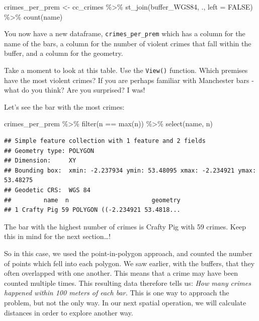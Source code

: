 \documentclass[
]{book}
\newenvironment{Shaded}{\begin{snugshade}}{\end{snugshade}}
\newcommand{\AttributeTok}[1]{\textcolor[rgb]{0.77,0.63,0.00}{#1}}
\newcommand{\ConstantTok}[1]{\textcolor[rgb]{0.00,0.00,0.00}{#1}}
\newcommand{\FunctionTok}[1]{\textcolor[rgb]{0.00,0.00,0.00}{#1}}
\newcommand{\NormalTok}[1]{#1}
\newcommand{\OtherTok}[1]{\textcolor[rgb]{0.56,0.35,0.01}{#1}}
\newcommand{\SpecialCharTok}[1]{\textcolor[rgb]{0.00,0.00,0.00}{#1}}
\begin{document}
\begin{Shaded}
\begin{Highlighting}[]
\NormalTok{crimes\_per\_prem }\OtherTok{\textless{}{-}}\NormalTok{ cc\_crimes }\SpecialCharTok{\%\textgreater{}\%} 
  \FunctionTok{st\_join}\NormalTok{(buffer\_WGS84, ., }\AttributeTok{left =} \ConstantTok{FALSE}\NormalTok{) }\SpecialCharTok{\%\textgreater{}\%} 
  \FunctionTok{count}\NormalTok{(name)}
\end{Highlighting}
\end{Shaded}

You now have a new dataframe, \texttt{crimes\_per\_prem} which has a column for the name of the bars, a column for the number of violent crimes that fall within the buffer, and a column for the geometry.

Take a moment to look at this table. Use the \texttt{View()} function. Which premises have the most violent crimes? If you are perhaps familiar with Manchester bars - what do you think? Are you surprised? I was!

Let's see the bar with the most crimes:

\begin{Shaded}
\begin{Highlighting}[]
\NormalTok{crimes\_per\_prem }\SpecialCharTok{\%\textgreater{}\%} \FunctionTok{filter}\NormalTok{(n }\SpecialCharTok{==} \FunctionTok{max}\NormalTok{(n)) }\SpecialCharTok{\%\textgreater{}\%} \FunctionTok{select}\NormalTok{(name, n)}
\end{Highlighting}
\end{Shaded}

\begin{verbatim}
## Simple feature collection with 1 feature and 2 fields
## Geometry type: POLYGON
## Dimension:     XY
## Bounding box:  xmin: -2.237934 ymin: 53.48095 xmax: -2.234921 ymax: 53.48275
## Geodetic CRS:  WGS 84
##         name  n                       geometry
## 1 Crafty Pig 59 POLYGON ((-2.234921 53.4818...
\end{verbatim}

The bar with the highest number of crimes is Crafty Pig with 59 crimes. Keep this in mind for the next section\ldots!

So in this case, we used the point-in-polygon approach, and counted the number of points which fell into each polygon. We saw earlier, with the buffers, that they often overlapped with one another. This means that a crime may have been counted multiple times. This resulting data therefore tells us: \emph{How many crimes happened within 100 meters of each bar.} This is one way to approach the problem, but not the only way. In our next spatial operation, we will calculate distances in order to explore another way.
\end{document}
